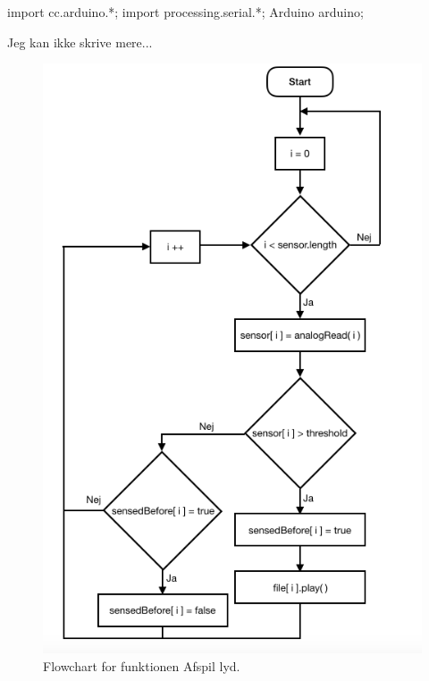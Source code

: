 import cc.arduino.*;
import processing.serial.*;
Arduino arduino;

Jeg kan ikke skrive mere... 



\begin{figure}
\centering
\includegraphics[scale=0.4]{Figure/protoFlowChart02.png}
\caption{
Flowchart for funktionen Afspil lyd. }
\label{fig:protoFlowChart02.png}
\end{figure}

 